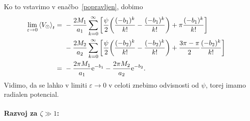 \documentclass[12pt, a4paper]{article}
\newcommand{\e}{
    \ensuremath{\mathrm{e}}
}
\newcommand{\avgt}[1]{
	\ensuremath{\left\langle #1 \right\rangle_t}
}
\begin{document}
Ko to vstavimo v ena\v cbo~\eqref{popravljen}, dobimo
\begin{align}
	\lim_{\varepsilon \to 0}\avgt{V_\odot} =\ &-\frac{2M_1}{a_1}\sum_{k = 0}^\infty \bigg[\frac{\psi}{2}
		\bigg(\frac{(-b_1)^k}{k!} - \frac{(-b_1)^k}{k!}\bigg) + \pi\frac{(-b_1)^k}{k!}\bigg] \notag \\
		&-\frac{2M_2}{a_2}\sum_{k = 0}^\infty \bigg[\frac{\psi}{2}
	\bigg(\frac{(-b_2)^k}{k!} - \frac{(-b_2)^k}{k!}\bigg) + \frac{3\pi - \pi}{2}\frac{(-b_2)^k}{k!}\bigg] \notag \\
	=\ &-\frac{2\pi M_1}{a_1}\e^{-b_1} -\frac{2\pi M_2}{a_2}\e^{-b_2}.
\end{align}
Vidimo, da se lahko v limiti $\varepsilon \to 0$ v celoti znebimo odvisnosti od $\psi$, torej imamo radialen
potencial.

\paragraph{Razvoj za $\zeta \gg 1$:}
\end{document}

